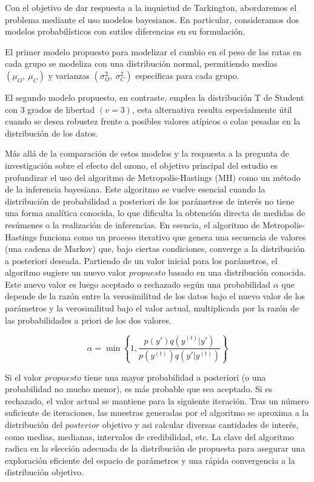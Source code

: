 \documentclass[
]{article}
\begin{document}
Con el objetivo de dar respuesta a la inquietud de Tarkington, abordaremos
el problema mediante el uso modelos bayesianos. En particular, consideramos
dos modelos probabilísticos con sutiles diferencias en su formulación.

El primer modelo propuesto para modelizar el cambio en el peso de las ratas
en cada grupo se modeliza con una distribución normal, permitiendo medias
\((\mu_O,\ \mu_C)\) y varianzas \((\sigma_O^2,\ \sigma_C^2)\) específicas para
cada grupo.

El segundo modelo propuesto, en contraste, emplea la distribución T
de Student con 3 grados de libertad \((v = 3)\), esta alternativa
resulta especialmente útil cuando se desea robustez frente a posibles
valores atípicos o colas pesadas en la distribución de los datos.

Más allá de la comparación de estos modelos y la respuesta a la pregunta
de investigación sobre el efecto del ozono, el objetivo principal del
estudio es profundizar el uso del algoritmo de Metropolis-Hastings (MH)
como un método de la inferencia bayesiana. Este algoritmo se vuelve
esencial cuando la distribución de probabilidad a posteriori de los
parámetros de interés no tiene una forma analítica conocida, lo que
dificulta la obtención directa de medidas de resúmenes o la realización
de inferencias. En esencia, el algoritmo de Metropolis-Hastings funciona
como un proceso iterativo que genera una secuencia de valores (una
cadena de Markov) que, bajo ciertas condiciones, converge a la
distribución a posteriori deseada. Partiendo de un valor inicial para
los parámetros, el algoritmo sugiere un nuevo valor \(propuesto\) basado
en una distribución conocida. Este nuevo valor es luego aceptado o
rechazado según una probabilidad \(\alpha\) que depende de la razón entre
la verosimilitud de los datos bajo el nuevo valor de los parámetros y la
verosimilitud bajo el valor actual, multiplicada por la razón de las
probabilidades a priori de los dos valores.

\[\alpha = \min \left\{ 1, \frac{p(y')q(y^{(t)} | y')}{p(y^{(t)})q(y' | y^{(t)})} \right\}\]

Si el valor \(propuesto\) tiene una mayor probabilidad a posteriori (o una
probabilidad no mucho menor), es más probable que sea aceptado. Si es
rechazado, el valor actual se mantiene para la siguiente iteración. Tras
un número suficiente de iteraciones, las muestras generadas por el
algoritmo se aproxima a la distribución del \(posterior\) objetivo y asi
calcular diversas cantidades de interés, como medias, medianas,
intervalos de credibilidad, etc. La clave del algoritmo radica en la
elección adecuada de la distribución de propuesta para asegurar una
exploración eficiente del espacio de parámetros y una rápida
convergencia a la distribución objetivo.
\end{document}
